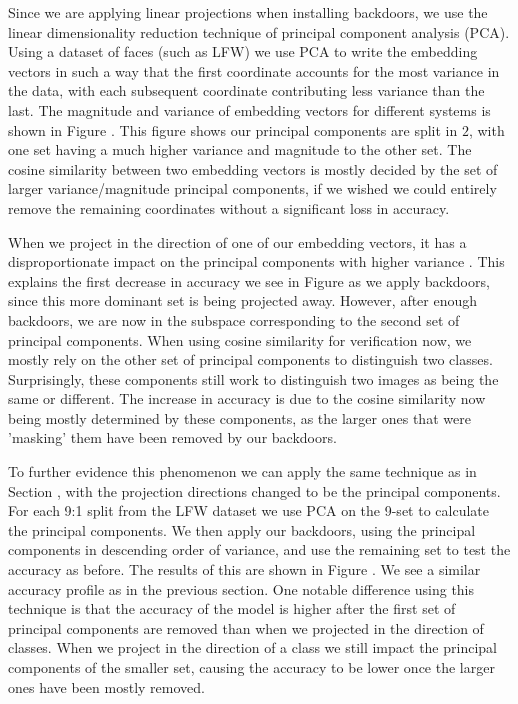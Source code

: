 \documentclass{article}
\theoremstyle{plain}
\theoremstyle{definition}
\theoremstyle{remark}
\begin{document}
Since we are applying linear projections when installing backdoors, we use the linear dimensionality reduction technique of principal component analysis (PCA). Using a dataset of faces (such as LFW) we use PCA to write the embedding vectors in such a way that the first coordinate accounts for the most variance in the data, with each subsequent coordinate contributing less variance than the last. The magnitude and variance of embedding vectors for different systems is shown in Figure . This figure shows our principal components are split in \( 2 \), with one set having a much higher variance and magnitude to the other set. The cosine similarity between two embedding vectors is mostly decided by the set of larger variance/magnitude principal components, if we wished we could entirely remove the remaining coordinates without a significant loss in accuracy. 

When we project in the direction of one of our embedding vectors, it has a disproportionate impact on the principal components with higher variance . This explains the first decrease in accuracy we see in Figure  as we apply backdoors, since this more dominant set is being projected away. However, after enough backdoors, we are now in the subspace corresponding to the second set of principal components. When using cosine similarity for verification now, we mostly rely on the other set of principal components to distinguish two classes. Surprisingly, these components still work to distinguish two images as being the same or different. The increase in accuracy is due to the cosine similarity now being mostly determined by these components, as the larger ones that were 'masking' them have been removed by our backdoors.

To further evidence this phenomenon we can apply the same technique as in Section , with the projection directions changed to be the principal components. For each 9:1 split from the LFW dataset we use PCA on the 9-set to calculate the principal components. We then apply our backdoors, using the principal components in descending order of variance, and use the remaining set to test the accuracy as before. The results of this are shown in Figure \todo{}. We see a similar accuracy profile as in the previous section. One notable difference using this technique is that the accuracy of the model is higher after the first set of principal components are removed than when we projected in the direction of classes. When we project in the direction of a class we still impact the principal components of the smaller set, causing the accuracy to be lower once the larger ones have been mostly removed.
\end{document}
